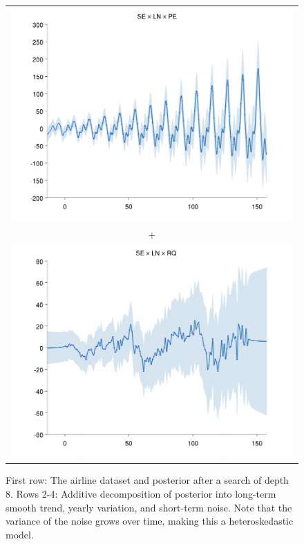 \documentclass[twoside]{article}
\begin{document}
\begin{figure}[h!]
\begin{tabular}{c}
 \includegraphics[width=\wagd,height=\hagd]{../figures/decomposition/01-airline-months_max_level_8/01-airline-months_2} \\
 + \\
 \includegraphics[width=\wagd,height=\hagd]{../figures/decomposition/01-airline-months_max_level_8/01-airline-months_3}
\end{tabular}
\caption{First row:  The airline dataset and posterior after a search of depth 8.  Rows 2-4: Additive decomposition of posterior into long-term smooth trend, yearly variation, and short-term noise.  Note that the variance of the noise grows over time, making this a heteroskedastic model.}
\label{fig:airline_decomp}
\end{figure}
\end{document}
